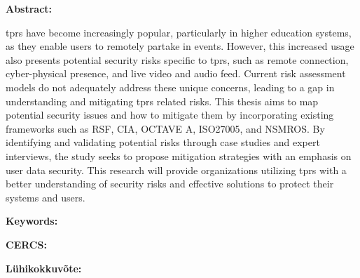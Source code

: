 
\newpage
\noindent\textbf{\large {\thesisTitle}}

\vspace*{3ex}

\noindent\textbf{Abstract:}
\vspace{-1ex}

\ac{tprs} have become increasingly popular, particularly
in higher education systems, as they enable users to remotely partake in
events. However, this increased usage also presents potential security risks
specific to \ac{tprs}, such as remote connection, cyber-physical presence, and
live video and audio feed. Current risk assessment models do not adequately
address these unique concerns, leading to a gap in understanding and
mitigating \ac{tprs} related risks.
This thesis aims to map potential security issues and how to mitigate them by incorporating existing
frameworks such as RSF, CIA, OCTAVE A, ISO27005, and NSMROS. By identifying and validating
potential risks through case studies and expert interviews, the study seeks
to propose mitigation strategies with an emphasis on user data security.
This research will provide organizations utilizing \ac{tprs} with a
better understanding of security risks and effective solutions to protect
their systems and users.

\vspace*{1ex}

\noindent\textbf{Keywords:}
\vspace{-1ex}

{\thesisKeywords}

\vspace*{1ex}


\noindent\textbf{CERCS:}
\vspace{-1ex}

{\thesisCERCS}

\vspace*{1ex}

\noindent\textbf{\large {\thesisTitleEst}}
\vspace*{1ex}

\noindent\textbf{Lühikokkuvõte:}
\vspace{-1ex}

